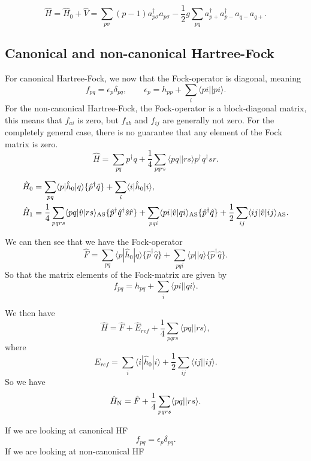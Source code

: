 \documentclass[a4paper, 11pt, notitlepage, english]{article}
\newcommand{\brakket}[2]{\langle #1 || #2 \rangle}
\newcommand{\op}[1]{\hat{#1}}
\newcommand{\braopket}[3]{\langle #1 | {#2} | #3 \rangle}
\newcommand{\eps}{\epsilon}
\begin{document}
\clearpage







$$\op{H} = \op{H}_0 + \op{V} = \sum_{p \sigma} (p-1)a_{p\sigma}^\dagger a_{p\sigma} 
 -\frac{1}{2}g \sum_{p q} a_{p+}^\dagger a_{p-}^\dagger a_{q-} a_{q+}.$$


\subsection*{Canonical and non-canonical Hartree-Fock}

For canonical Hartree-Fock, we now that the Fock-operator is diagonal, meaning
$$f_{pq} = \eps_p \delta_{pq}, \qquad \eps_p = h_{pp} + \sum_{i}\brakket{pi}{pi}.$$
For the non-canonical Hartree-Fock, the Fock-operator is a block-diagonal matrix, this means that $f_{ai}$ is zero, but $f_{ab}$ and $f_{ij}$ are generally not zero.
For the completely general case, there is no guarantee that any element of the Fock matrix is zero.
$$\op{H} = \sum_{pq} p^\dagger q + \frac{1}{4}\sum_{pqrs}\brakket{pq}{rs}p^\dagger q^\dagger s r.$$

\begin{align*}
\op{H}_0 &= \sum_{pq}\braopket{p}{\op{h}_0}{q}\{\op{p}^\dag \op{q}\} + \sum_{i}\braopket{i}{\op{h}_0}{i}, \\
\op{H}_1 &= \frac{1}{4}\sum_{pqrs} \braopket{pq}{\op{v}}{rs}_{\rm AS} \{\op{p}^\dag \op{q}^\dag \op{s}\op{r}\} + \sum_{pqi} \braopket{pi}{\op{v}}{qi}_{\rm AS} \{ \op{p}^\dag \op{q} \} + \frac{1}{2}\sum_{ij} \braopket{ij}{\op{v}}{ij}_{\rm AS}.
\end{align*}

We can then see that we have the Fock-operator
$$\op{F} = \sum_{pq} \braopket{p}{\op{h}_0}{q}\{\op{p}^\dagger\op{q}\} + \sum_{pqi} \brakket{p}{q}\{\op{p}^\dagger\op{q}\}.$$
So that the matrix elements of the Fock-matrix are given by
$$f_{pq} = h_{pq} + \sum_{i}\brakket{pi}{qi}.$$

We then have
$$\op{H} = \op{F} + \op{E}_{ref} + \frac{1}{4}\sum_{pqrs}\brakket{pq}{rs},$$
where
$$E_{ref} = \sum_i \braopket{i}{\op{h}_0}{i} + \frac{1}{2}\sum_{ij}\brakket{ij}{ij}.$$
So we have
$$\op{H}_{\rm N} = \op{F} + \frac{1}{4}\sum_{pqrs}\brakket{pq}{rs}.$$

If we are looking at canonical HF
$$f_{pq} = \eps_p \delta_{pq}.$$
If we are looking at non-canonical HF




\clearpage
\end{document}
